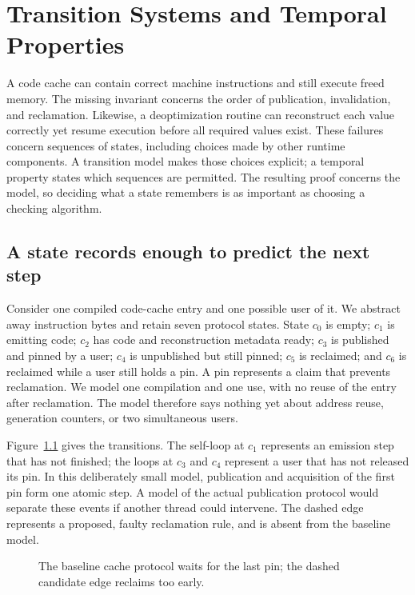 \chapter{Transition Systems and Temporal Properties}
\label{ch:transition-temporal-properties}

A code cache can contain correct machine instructions and still execute freed memory.
The missing invariant concerns the order of publication, invalidation, and reclamation.
Likewise, a deoptimization routine can reconstruct each value correctly yet resume execution before all required values exist.
These failures concern sequences of states, including choices made by other runtime components.
A transition model makes those choices explicit; a temporal property states which sequences are permitted.
The resulting proof concerns the model, so deciding what a state remembers is as important as choosing a checking algorithm.

\section{A state records enough to predict the next step}
\label{sec:ch45-state-model}

Consider one compiled code-cache entry and one possible user of it.
We abstract away instruction bytes and retain seven protocol states.
State $c_0$ is empty; $c_1$ is emitting code; $c_2$ has code and reconstruction metadata ready; $c_3$ is published and pinned by a user; $c_4$ is unpublished but still pinned; $c_5$ is reclaimed; and $c_6$ is reclaimed while a user still holds a pin.
A pin represents a claim that prevents reclamation.
We model one compilation and one use, with no reuse of the entry after reclamation.
The model therefore says nothing yet about address reuse, generation counters, or two simultaneous users.

Figure~\ref{fig:ch45-cache} gives the transitions.
The self-loop at $c_1$ represents an emission step that has not finished; the loops at $c_3$ and $c_4$ represent a user that has not released its pin.
In this deliberately small model, publication and acquisition of the first pin form one atomic step.
A model of the actual publication protocol would separate these events if another thread could intervene.
The dashed edge represents a proposed, faulty reclamation rule, and is absent from the baseline model.

\begin{figure}[tbp]
\centering

\caption{The baseline cache protocol waits for the last pin; the dashed candidate edge reclaims too early.}
\label{fig:ch45-cache}
\end{figure}

